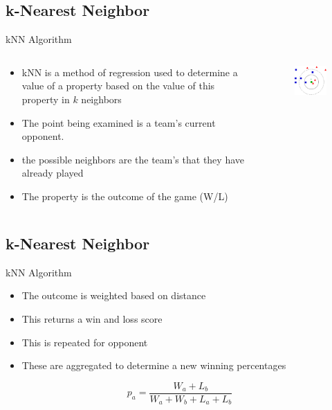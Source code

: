 \documentclass{beamer}
\begin{document}
\subsection{k-Nearest Neighbor}

\begin{frame}{kNN Algorithm}
  \begin{columns}
    \begin{column}{0.55\textwidth}
\begin{itemize}
\item kNN is a method of regression used to determine a value of a property based on the value of this property in $k$ neighbors
\item The point being examined is a team's current opponent.
\item the possible neighbors are the team's that they have already played
\item The property is the outcome of the game (W/L)
\end{itemize}
    \end{column}


    \begin{column}{0.45\textwidth}
 \begin{figure}[!t]
 \centering
 \includegraphics[width=2in]{kNN.png} 
 \end{figure}
\end{column}
\end{columns}

\end{frame}


\subsection{k-Nearest Neighbor}

\begin{frame}{kNN Algorithm}
\begin{itemize}
\item The outcome is weighted based on distance
\item This returns a win and loss score
\item This is repeated for opponent
\item These are aggregated to determine a new winning percentages
\end{itemize}
\[
p_{a} = \frac{W_a + L_b}{W_a + W_b + L_a + L_b}
\]


\end{frame}
\end{document}
